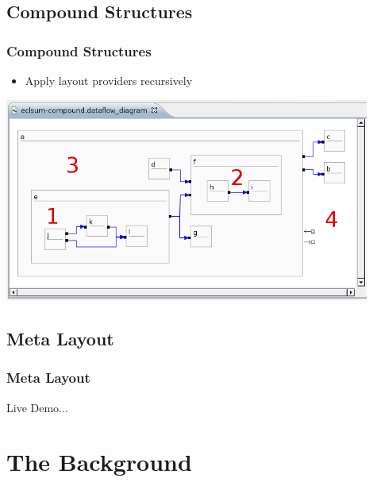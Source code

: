 \subsection{Compound Structures}
\begin{frame}
  \frametitle{Compound Structures}
  \begin{itemize}
    \item Apply layout providers recursively
  \end{itemize}
  \begin{center}
    \includegraphics[width=0.9\textwidth]{images/compound-layout.png}
  \end{center}
\end{frame}

\subsection{Meta Layout}
\begin{frame}
  \frametitle{Meta Layout}
  \begin{center}
    {\Large Live Demo...}
  \end{center}
\end{frame}

\section{The Background}

